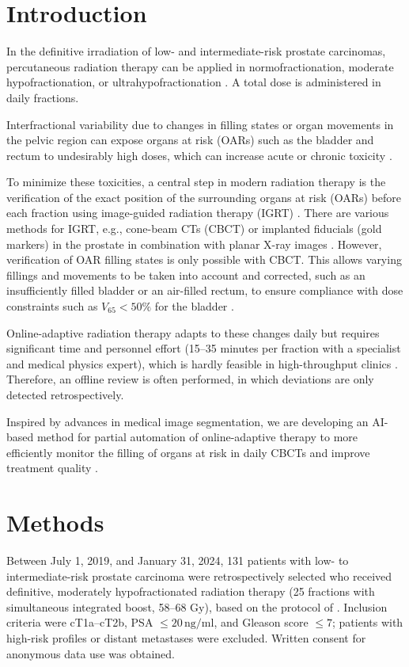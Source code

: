 \documentclass{article}
\begin{document}
\section{Introduction}
In the definitive irradiation of low- and intermediate-risk prostate
carcinomas, percutaneous radiation therapy can be applied in
normofractionation, moderate hypofractionation, or ultrahypofractionation
\citep{numakura2023,junius2007,dimuzio2009}. A total dose is administered in
daily fractions.

Interfractional variability due to changes in filling states or organ movements
in the pelvic region can expose organs at risk (OARs) such as the bladder and
rectum to undesirably high doses, which can increase acute or chronic toxicity
\citep{quantec,devlin2015}.

To minimize these toxicities, a central step in modern radiation therapy is the
verification of the exact position of the surrounding organs at risk (OARs)
before each fraction using image-guided radiation therapy (IGRT)
\citep{kupelian2007,wang2022}. There are various methods for IGRT, e.g.,
cone-beam CTs (CBCT) or implanted fiducials (gold markers) in the prostate in
combination with planar X-ray images \citep{dang2018}. However, verification of
OAR filling states is only possible with CBCT. This allows varying fillings and
movements to be taken into account and corrected, such as an insufficiently
filled bladder or an air-filled rectum, to ensure compliance with dose
constraints such as \( V_{65} < 50\% \) for the bladder \citep{wall2018}.

Online-adaptive radiation therapy adapts to these changes daily but requires
significant time and personnel effort (15–35 minutes per fraction with a
specialist and medical physics expert), which is hardly feasible in
high-throughput clinics \citep{byrne2022}. Therefore, an offline review is
often performed, in which deviations are only detected retrospectively.

Inspired by advances in medical image segmentation, we are developing an
AI-based method for partial automation of online-adaptive therapy to more
efficiently monitor the filling of organs at risk in daily CBCTs and
improve treatment quality \citep{antonelli2022}.

\section{Methods}
Between July 1, 2019, and January 31, 2024, 131 patients with low- to
intermediate-risk prostate carcinoma were retrospectively selected who received
definitive, moderately hypofractionated radiation therapy (25 fractions with
simultaneous integrated boost, 58–68 Gy), based on the protocol of
\citep{dimuzio2009}. Inclusion criteria were cT1a–cT2b, PSA $\leq
20\,\text{ng/ml}$, and Gleason score $\leq 7$; patients with high-risk profiles
or distant metastases were excluded. Written consent for anonymous data use was
obtained.
\end{document}
